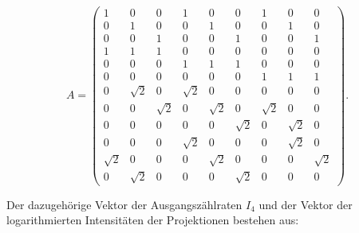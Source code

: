  \begin{equation*}
   A = \begin{pmatrix}
              1 & 0 & 0 & 1 & 0 & 0 & 1 & 0 & 0 \\
              0 & 1 & 0 & 0 & 1 & 0 & 0 & 1 & 0 \\
              0 & 0 & 1 & 0 & 0 & 1 & 0 & 0 & 1 \\
              1 & 1 & 1 & 0 & 0 & 0 & 0 & 0 & 0 \\
              0 & 0 & 0 & 1 & 1 & 1 & 0 & 0 & 0 \\
              0 & 0 & 0 & 0 & 0 & 0 & 1 & 1 & 1 \\
              0 & \sqrt{2} & 0 & \sqrt{2} & 0 & 0 & 0 & 0 & 0 \\
              0 & 0 & \sqrt{2} & 0 & \sqrt{2} & 0 & \sqrt{2} & 0 & 0 \\
              0 & 0 & 0 & 0 & 0 & \sqrt{2} & 0 & \sqrt{2} & 0 \\
              0 & 0 & 0 & \sqrt{2} & 0 & 0 & 0 & \sqrt{2} & 0 \\
              \sqrt{2} & 0 & 0 & 0 & \sqrt{2} & 0 & 0 & 0 & \sqrt{2} \\
              0 & \sqrt{2} & 0 & 0 & 0 & \sqrt{2} & 0 & 0 & 0
      \end{pmatrix}.
 \end{equation*}

Der dazugehörige Vektor der Ausgangszählraten $I_4$ und der Vektor der
logarithmierten Intensitäten der
Projektionen bestehen aus:

